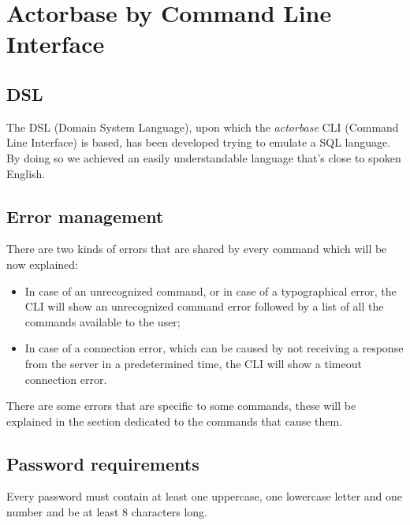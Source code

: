 \documentclass{scalatekids-article}
\begin{document}
\section{Actorbase by Command Line Interface}

\subsection{DSL} %

The DSL (Domain System Language), upon which the \textit{actorbase} CLI (Command
Line Interface) is based, has been developed trying to emulate a SQL language.
By doing so we achieved an easily understandable language that's close to spoken
English.

\subsection{Error management}

There are two kinds of errors that are shared by every command which will be
now explained:
\begin{itemize}
\item In case of an unrecognized command, or in case of a typographical error,
  the CLI will show an unrecognized command error followed by a list of all
  the commands available to the user;
\item In case of a connection error, which can be caused by not receiving a
  response from the server in a predetermined time, the CLI will show a
  timeout connection error.
\end{itemize}
There are some errors that are specific to some commands, these will be explained
in the section dedicated to the commands that cause them.


\subsection{Password requirements}
\label{sec:passwordrequirement}
Every password must contain at least one uppercase, one lowercase letter and one
number and be at least 8 characters long.
\end{document}
